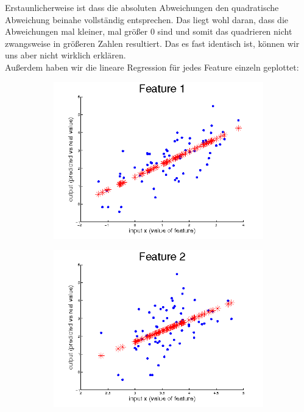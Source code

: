 \documentclass{article}
\begin{document}
	Erstaunlicherweise ist dass die absoluten Abweichungen den quadratische Abweichung beinahe vollständig entsprechen. Das liegt wohl daran, dass die Abweichungen mal kleiner, mal größer 0 sind und somit das quadrieren nicht zwangsweise in größeren Zahlen resultiert. Das es fast identisch ist, können wir uns aber nicht wirklich erklären.\\
	
	Außerdem haben wir die lineare Regression für jedes Feature einzeln geplottet:
	\begin{figure}[H]
	  \begin{subfigure}
	    \centering
	    \includegraphics[scale=0.4,bb=0 0 576 432]{task2-feature1.png}
	  \end{subfigure}
	  \begin{subfigure}
	    \centering
	    \includegraphics[scale=0.4,bb=0 0 576 432]{task2-feature2.png}
	  \end{subfigure}
	\end{figure}
\end{document}
